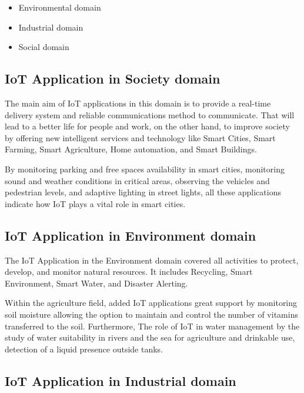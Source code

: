 \documentclass[conference]{IEEEtran}
\begin{document}
\begin{itemize}
	\item Environmental domain
	\item Industrial domain
	\item Social domain
	
\end{itemize}



\subsection{IoT Application in Society domain }

The main aim of IoT applications in this domain is to provide a real-time delivery system and reliable communications method to communicate. That will lead to a better life for people and work, on the other hand, to improve society by offering new intelligent services and technology like  Smart Cities, Smart Farming, Smart Agriculture,  Home automation, and Smart Buildings.

By monitoring parking and free spaces availability in smart cities, monitoring sound and weather conditions in critical areas, observing the vehicles and pedestrian levels, and adaptive lighting in street lights, all these applications indicate how IoT plays a vital role in smart cities. \cite{por3}



\subsection{IoT Application in Environment domain}

The IoT Application in the Environment domain covered all activities to protect, develop, and monitor natural resources. It includes  Recycling, Smart Environment, Smart Water, and Disaster Alerting. 

Within the agriculture field, added IoT applications great support by monitoring soil moisture allowing the option to maintain and control the number of vitamins transferred to the soil. Furthermore, The role of IoT in water management by the study of water suitability in rivers and the sea for agriculture and drinkable use, detection of a liquid presence outside tanks.\cite{por4}

\subsection{IoT Application in Industrial domain}
\end{document}
